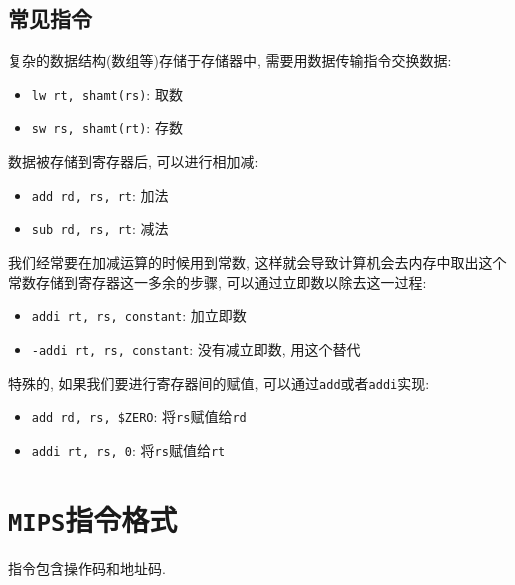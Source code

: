 \subsection{常见指令}
复杂的数据结构(数组等)存储于存储器中, 需要用数据传输指令交换数据:
\begin{itemize}
\item \verb|lw rt, shamt(rs)|: 取数
\item \verb|sw rs, shamt(rt)|: 存数
\end{itemize}\par
数据被存储到寄存器后, 可以进行相加减:
\begin{itemize}
\item \verb|add rd, rs, rt|: 加法
\item \verb|sub rd, rs, rt|: 减法
\end{itemize}\par
我们经常要在加减运算的时候用到常数, 这样就会导致计算机会去内存中取出这个常数存储到寄存器这一多余的步骤, 可以通过立即数以除去这一过程:
\begin{itemize}
\item \verb|addi rt, rs, constant|: 加立即数
\item \verb|-addi rt, rs, constant|: 没有减立即数, 用这个替代
\end{itemize}\par 
特殊的, 如果我们要进行寄存器间的赋值, 可以通过\verb|add|或者\verb|addi|实现:
\begin{itemize}
\item \verb|add rd, rs, $ZERO|: 将\verb|rs|赋值给\verb|rd|
\item \verb|addi rt, rs, 0|: 将\verb|rs|赋值给\verb|rt|
\end{itemize}
\section{\texttt{MIPS}指令格式}
指令包含操作码和地址码.
